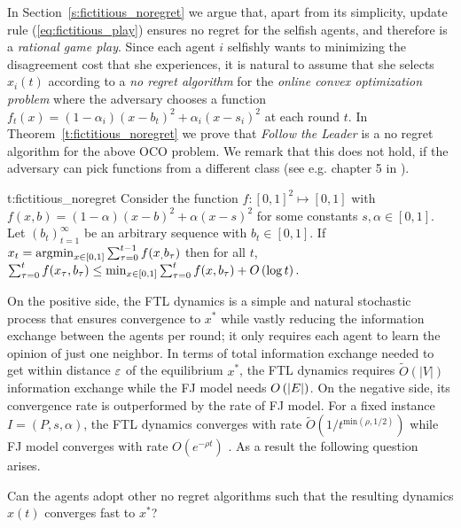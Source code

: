 In Section~\ref{s:fictitious_noregret} we argue that,
apart from its simplicity, update rule (\ref{eq:fictitious_play}) ensures
no regret for the selfish agents, and therefore is a \emph{rational game play}.
Since each agent $i$ selfishly wants to minimizing the disagreement cost
that she experiences, it is natural to assume that she selects $x_i(t)$ according to
a \emph{no regret algorithm} for the \emph{online convex optimization problem}
where the adversary chooses a function $f_t(x)=(1-\alpha_i)(x-b_t)^2 + \alpha_i(x-s_i)^2$
at each round $t$. In Theorem~\ref{t:fictitious_noregret}
we prove that \emph{Follow the Leader} is a no regret algorithm
for the above OCO problem. We remark that this does not hold,
if the adversary can pick functions from a different class
(see e.g. chapter 5 in \cite{Haz16}).

\begin{reptheorem}{t:fictitious_noregret}
  Consider the function $f:[0,1]^2 \mapsto [0,1]$ with
  $f(x,b) = (1-\alpha)(x-b)^2 + \alpha(x-s)^2$ for some
  constants $s,\alpha \in [0,1]$.
  Let $(b_t)_{t=1}^\infty$ be an arbitrary sequence with
  $b_t \in [0,1]$. If $x_t = \operatorname*{argmin}_{x \in [0,1]}\sum_{\tau=0}^{t-1}f(x_,b_\tau)$
  then for all $t$,
  \(
    \sum_{\tau=0}^{t}f(x_\tau,b_\tau) \leq
    \min_{x \in [0,1]}\sum_{\tau=0}^tf(x,b_\tau) + O\left(\log t\right).
  \)
\end{reptheorem}

On the positive side, the FTL dynamics is a simple and natural
stochastic process that ensures convergence to $x^*$ while
vastly reducing the information exchange between the agents
per round; it only requires each agent to learn the opinion
of just one neighbor. In terms of total information exchange
needed to get within distance $\varepsilon$ of the equilibrium $x^*$,
the FTL dynamics requires $\widetilde{O}(|V|)$ information
exchange while the FJ model needs $O\left(|E|\right)$.
On the negative side, its convergence rate is outperformed by the rate of FJ
model.  For a fixed instance $I=(P,s,\alpha)$, the FTL dynamics converges with
rate $\widetilde{O}(1/t^{\text{min}(\rho,1/2)})$ while FJ model
converges with rate $O(e^{-\rho t})$ \cite{GS14}.
As a result the following question arises.
\begin{question}
  Can the agents adopt other no regret algorithms such that the resulting
  dynamics $x(t)$ converges fast to $x^*$?
\end{question}

